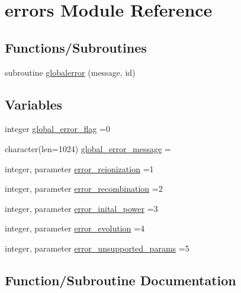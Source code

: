 \hypertarget{namespaceerrors}{}\section{errors Module Reference}
\label{namespaceerrors}
\subsection*{Functions/\+Subroutines}
\begin{DoxyCompactItemize}
\item 
subroutine \mbox{\hyperlink{namespaceerrors_a318b5ebaf7fbc154515be2da7e932943}{globalerror}} (message, id)
\end{DoxyCompactItemize}
\subsection*{Variables}
\begin{DoxyCompactItemize}
\item 
integer \mbox{\hyperlink{namespaceerrors_a72cd38a036b5cc55888b987007b85249}{global\+\_\+error\+\_\+flag}} =0
\item 
character(len=1024) \mbox{\hyperlink{namespaceerrors_abab090a06678767efd048592898c9a59}{global\+\_\+error\+\_\+message}} = \textquotesingle{}\textquotesingle{}
\item 
integer, parameter \mbox{\hyperlink{namespaceerrors_af0216e646e10d4fb6e16b7689e064c0c}{error\+\_\+reionization}} =1
\item 
integer, parameter \mbox{\hyperlink{namespaceerrors_a55a475464d72722fbbec043e76f4032e}{error\+\_\+recombination}} =2
\item 
integer, parameter \mbox{\hyperlink{namespaceerrors_a6e8381a408cbe8e72b8ed0473d558c68}{error\+\_\+inital\+\_\+power}} =3
\item 
integer, parameter \mbox{\hyperlink{namespaceerrors_a157310f82f1d3896291c10265618ba56}{error\+\_\+evolution}} =4
\item 
integer, parameter \mbox{\hyperlink{namespaceerrors_a3f1716926bd8afa933e82e1a8bcdd413}{error\+\_\+unsupported\+\_\+params}} =5
\end{DoxyCompactItemize}


\subsection{Function/\+Subroutine Documentation}
\mbox{\label{namespaceerrors_a318b5ebaf7fbc154515be2da7e932943}} 
